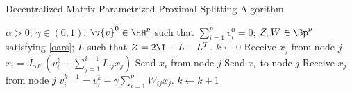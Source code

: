 
\begin{algorithm} 
    \caption{Decentralized Matrix-Parametrized Proximal Splitting Algorithm}\label{n_iteration_parallel} 
    \begin{algorithmic}[1] 
    \Require $\alpha > 0$; $\gamma \in (0,1)$; $\v{v}^0 \in \HH^p$ such that $\sum_{i=1}^p v_i^0 = 0$; $Z, W \in \Sp^p$ satisfying \eqref{oars}; $L$ such that $Z=2\I - L - L^T$.
    \State $k \gets 0$
    \Repeat
              \State Receive $x_j$ from node $j$
            \EndIf
        \EndFor
        \State $x_i = J_{\alpha F_i}\left(v_i^{k} + \sum_{j=1}^{i-1}L_{ij} x_j\right)$\label{n_itr1_parallel}
          \State Send $x_i$ from node $j$
        \EndIf
        \EndFor
            \State Send $x_i$ to node $j$
        \EndIf
        \EndFor
            \State Receive $x_j$ from node $j$
        \EndIf
        \EndFor
        \State $v_i^{k+1} = v_i^{k} - \gamma \sum_{i=1}^p W_{ij}x_j$.\label{n_itr2_parallel}
    \EndFor
    \State $k \gets k+1$
\end{algorithmic}
\end{algorithm}

